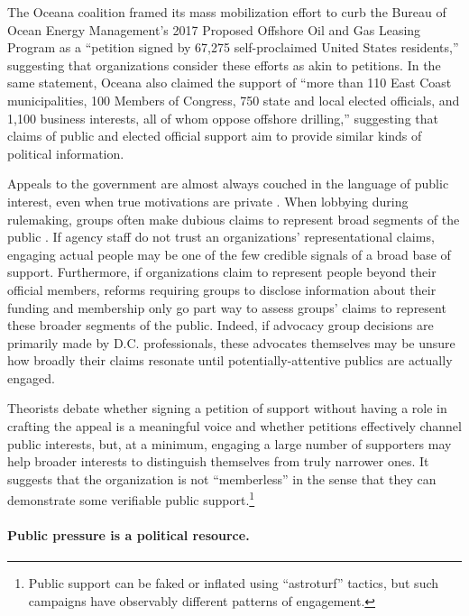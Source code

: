 \documentclass[
      12pt,
        ]{article}
\begin{document}
The Oceana coalition framed its mass mobilization effort to curb the
Bureau of Ocean Energy Management's 2017 Proposed Offshore Oil and Gas
Leasing Program as a ``petition signed by 67,275 self-proclaimed United
States residents,'' suggesting that organizations consider these efforts
as akin to petitions. In the same statement, Oceana also claimed the
support of ``more than 110 East Coast municipalities, 100 Members of
Congress, 750 state and local elected officials, and 1,100 business
interests, all of whom oppose offshore drilling,'' suggesting that claims
of public and elected official support aim to provide similar kinds of
political information.

Appeals to the government are almost always couched in the language of
public interest, even when true motivations are private
\citep{Schattschneider1975}. When lobbying during rulemaking, groups often
make dubious claims to represent broad segments of the public
\citep{Seifter2016UCLA}. If agency staff do not trust an organizations'
representational claims, engaging actual people may be one of the few
credible signals of a broad base of support. Furthermore, if
organizations claim to represent people beyond their official members,
reforms requiring groups to disclose information about their funding and
membership \citep{Seifter2016UCLA} only go part way to assess groups' claims
to represent these broader segments of the public. Indeed, if advocacy
group decisions are primarily made by D.C. professionals, these
advocates themselves may be unsure how broadly their claims resonate
until potentially-attentive publics are actually engaged.

Theorists debate whether signing a petition of support without
having a role in crafting the appeal is a meaningful voice and whether
petitions effectively channel public interests, but, at a minimum,
engaging a large number of supporters may help broader interests to
distinguish themselves from truly narrower ones. It suggests that the
organization is not ``memberless'' \citep{Skocpol2003} in the sense that they
can demonstrate some verifiable public support.\footnote{Public support can be faked or inflated using ``astroturf'' tactics, but such campaigns have observably different patterns of engagement.}

\hypertarget{public-pressure-is-a-political-resource.}{%
\paragraph{Public pressure is a political resource.}\label{public-pressure-is-a-political-resource.}}
\end{document}
